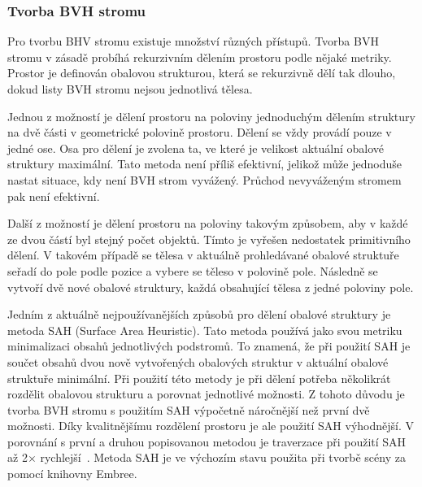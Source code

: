 \documentclass[czech,master]{diploma}
\begin{document}
\subsubsection*{Tvorba BVH stromu}
Pro tvorbu BHV stromu existuje množství různých přístupů. Tvorba BVH stromu v zásadě probíhá rekurzivním dělením prostoru podle nějaké metriky. Prostor je definován obalovou strukturou, která se rekurzivně dělí tak dlouho, dokud listy BVH stromu nejsou jednotlivá tělesa.\par
Jednou z možností je dělení prostoru na poloviny jednoduchým dělením struktury na dvě části v geometrické polovině prostoru. Dělení se vždy provádí pouze v jedné ose. Osa pro dělení je zvolena ta, ve které je velikost aktuální obalové struktury maximální. Tato metoda není příliš efektivní, jelikož může jednoduše nastat situace, kdy není BVH strom vyvážený. Průchod nevyváženým stromem pak není efektivní.\par
Další z možností je dělení prostoru na poloviny takovým způsobem, aby v každé ze dvou částí byl stejný počet objektů. Tímto je vyřešen nedostatek primitivního dělení. V takovém případě se tělesa v aktuálně prohledávané obalové struktuře seřadí do pole podle pozice a vybere se těleso v polovině pole. Následně se vytvoří dvě nové obalové struktury, každá obsahující tělesa z jedné poloviny pole.\par
Jedním z aktuálně nejpoužívanějších způsobů pro dělení obalové struktury je metoda SAH (Surface Area Heuristic). Tato metoda používá jako svou metriku minimalizaci obsahů jednotlivých podstromů. To znamená, že při použití SAH je součet obsahů dvou nově vytvořených obalových struktur v aktuální obalové struktuře minimální. Při použití této metody je při dělení potřeba několikrát rozdělit obalovou strukturu a porovnat jednotlivé možnosti. Z tohoto důvodu je tvorba BVH stromu s použitím SAH výpočetně náročnější než první dvě možnosti. Díky kvalitnějšímu rozdělení prostoru je ale použití SAH výhodnější. V porovnání s první a druhou popisovanou metodou je traverzace při použití SAH až 2\(\times\) rychlejší~\cite{SAH}. Metoda SAH je ve výchozím stavu použita při tvorbě scény za pomocí knihovny Embree.
\end{document}
